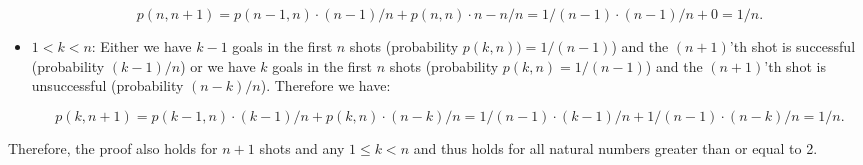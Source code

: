 \begin{solution}
\begin{itemize}
$$p(n, n+1) = p(n-1, n) \cdot (n-1)/n + p(n, n) \cdot n-n/n = 1/(n-1) \cdot (n-1)/n + 0 = 1/n.$$

\item $1 < k < n$: Either we have $k-1$ goals in the first $n$ shots (probability $p(k,n)) = 1/(n-1)$) and the $(n+1)$'th shot is successful (probability $(k-1)/n$) or we have $k$ goals in the first $n$ shots (probability $p(k,n)=1/(n-1)$) and the $(n+1)$'th shot is unsuccessful (probability $(n-k)/n$). Therefore we have:

$$p(k, n+1) = p(k-1, n) \cdot (k-1)/n + p(k, n) \cdot (n-k)/n = 1/(n-1) \cdot (k-1)/n + 1/(n-1) \cdot (n-k)/n = 1/n.$$
\end{itemize}

Therefore, the proof also holds for $n+1$ shots and any $1 \leq k < n$ and thus holds for all natural numbers greater than or equal to 2.
\end{solution}

